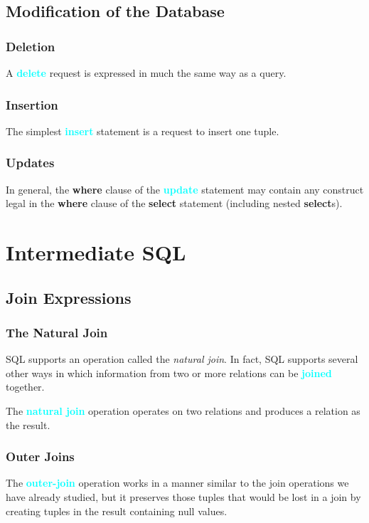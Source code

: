 \documentclass{Beautybook-EN}
\newcommand{\textcy}[1]{\textbf{\textcolor{cyan}{#1}}}
\begin{document}
\section{Modification of the Database}
\subsection{Deletion}

A \textcy{delete} request is expressed in much the same way as a query.

\subsection{Insertion}

The simplest \textcy{insert} statement is a request to insert one tuple.

\subsection{Updates}

In general, the \textbf{where} clause of the \textcy{update} statement may contain any construct legal in the \textbf{where} clause of the \textbf{select} statement (including nested \textbf{select}s).

\chapter{Intermediate SQL}
\section{Join Expressions}
\subsection{The Natural Join}

SQL supports an operation called the \textit{natural join}. In fact, SQL supports several other ways in which information from two or more relations can be \textcy{joined} together.

The \textcy{natural join} operation operates on two relations and produces a relation as the result.

\subsection{Outer Joins}

The \textcy{outer-join} operation works in a manner similar to the join operations we have already studied, but it preserves those tuples that would be lost in a join by creating tuples in the result containing null values.
\end{document}

